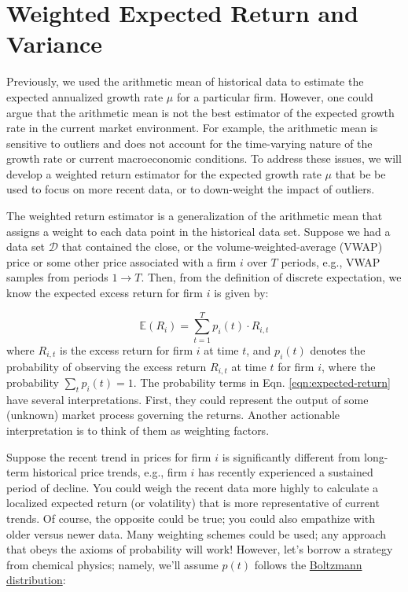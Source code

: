\documentclass[11pt]{article}
\theoremstyle{definition}
\begin{document}
\section*{Weighted Expected Return and Variance}
Previously, we used the arithmetic mean of historical data to estimate the expected annualized growth rate $\mu$ for a particular firm.
However, one could argue that the arithmetic mean is not the best estimator of the expected growth rate in the current market environment.
For example, the arithmetic mean is sensitive to outliers and does not account for the time-varying nature of the growth rate 
or current macroeconomic conditions. To address these issues, we will develop a weighted return estimator for the expected growth rate $\mu$
that be be used to focus on more recent data, or to down-weight the impact of outliers. 

The weighted return estimator is a generalization of the arithmetic mean that assigns a weight to each data point in the historical data set.
Suppose we had a data set $\mathcal{D}$ that contained the close, or the volume-weighted-average (VWAP) price 
or some other price associated with a firm $i$ over $T$ periods, e.g., VWAP samples from periods $1\rightarrow{T}$.
Then, from the definition of discrete expectation, we know the expected excess return for firm $i$ is given by:

\begin{equation}\label{eqn:expected-return}
\mathbb{E}\left(R_{i}\right) = \sum_{t=1}^{T}p_{i}(t)\cdot{R_{i,t}}
\end{equation}
where $R_{i,t}$ is the excess return for firm $i$ at time $t$, 
and $p_{i}(t)$ denotes the probability of observing the excess return $R_{i,t}$ at time $t$ for firm $i$, 
where the probability $\sum_{t}p_{i}(t) = 1$. 
The probability terms in Eqn. \eqref{eqn:expected-return} have several interpretations. 
First, they could represent the output of some (unknown) market process governing the returns. 
Another actionable interpretation is to think of them as weighting factors. 

Suppose the recent trend in prices for firm $i$ is significantly different from long-term historical price trends, 
e.g., firm $i$ has recently experienced a sustained period of decline. 
You could weigh the recent data more highly to calculate a localized expected return (or volatility) 
that is more representative of current trends. 
Of course, the opposite could be true; you could also empathize with older versus newer data. Many weighting schemes could be used; any approach that obeys the axioms of probability will work!
However, let's borrow a strategy from chemical physics; namely, we'll assume $p(t)$ follows the 
\href{https://en.wikipedia.org/wiki/Boltzmann_distribution}{Boltzmann distribution}:
\end{document}
